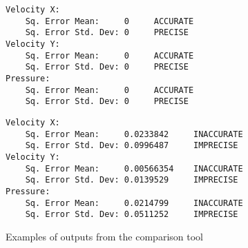 \begin{figure}[ht]
    \centering
    \begin{center}
\begin{minipage}{0.4\textwidth}\begin{verbatim}
Velocity X:
    Sq. Error Mean:     0     ACCURATE
    Sq. Error Std. Dev: 0     PRECISE
Velocity Y:
    Sq. Error Mean:     0     ACCURATE
    Sq. Error Std. Dev: 0     PRECISE
Pressure:
    Sq. Error Mean:     0     ACCURATE
    Sq. Error Std. Dev: 0     PRECISE
\end{verbatim}
\end{minipage}%
\hspace{0.02\textwidth}
\begin{minipage}{0.5\textwidth}\begin{verbatim}
Velocity X:
    Sq. Error Mean:     0.0233842     INACCURATE
    Sq. Error Std. Dev: 0.0996487     IMPRECISE
Velocity Y:
    Sq. Error Mean:     0.00566354    INACCURATE
    Sq. Error Std. Dev: 0.0139529     IMPRECISE
Pressure:
    Sq. Error Mean:     0.0214799     INACCURATE
    Sq. Error Std. Dev: 0.0511252     IMPRECISE
\end{verbatim}
%
\end{minipage}
\end{center}
    
    
    \caption{Examples of outputs from the comparison tool}
    \label{fig:example_comparisons}
\end{figure}